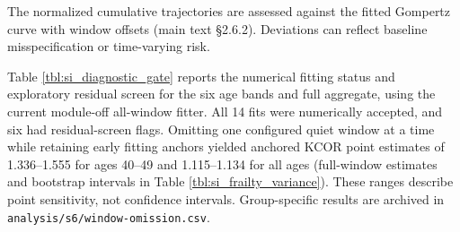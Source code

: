 \documentclass[
]{article}
\begin{document}
The normalized cumulative trajectories are assessed against the fitted Gompertz curve with window offsets (main text §2.6.2). Deviations can reflect baseline misspecification or time-varying risk.

Table \ref{tbl:si_diagnostic_gate} reports the numerical fitting status and exploratory residual screen for the six age bands and full aggregate, using the current module-off all-window fitter. All 14 fits were numerically accepted, and six had residual-screen flags. Omitting one configured quiet window at a time while retaining early fitting anchors yielded anchored KCOR point estimates of 1.336--1.555 for ages 40--49 and 1.115--1.134 for all ages (full-window estimates and bootstrap intervals in Table \ref{tbl:si_frailty_variance}). These ranges describe point sensitivity, not confidence intervals. Group-specific results are archived in \texttt{analysis/s6/window-omission.csv}.

\newpage
\end{document}

